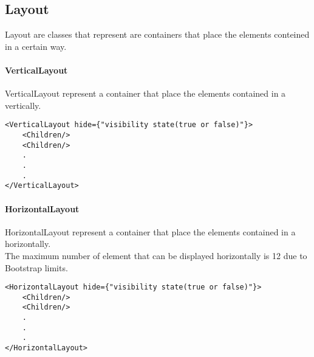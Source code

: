\subsection{Layout}
\begin{flushleft}
Layout are classes that represent are containers that place the elements conteined in a certain way.

\paragraph{VerticalLayout}
VerticalLayout represent a container that place the elements contained in a vertically.

\begin{verbatim}
<VerticalLayout hide={"visibility state(true or false)"}>
    <Children/>
    <Children/>
    .
    .
    .
</VerticalLayout>
\end{verbatim}

\paragraph{HorizontalLayout}
HorizontalLayout represent a container that place the elements contained in a horizontally.\\
The maximum number of element that can be displayed horizontally is 12
due to Bootstrap limits.

\begin{verbatim}
<HorizontalLayout hide={"visibility state(true or false)"}>
    <Children/>
    <Children/>
    .
    .
    .
</HorizontalLayout>
\end{verbatim}
\end{flushleft}


